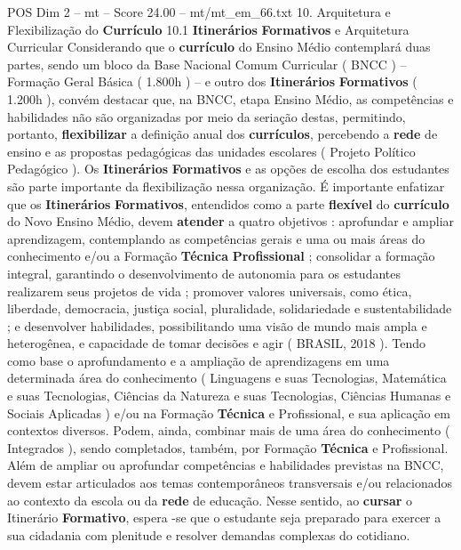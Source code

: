\begin{textsample}{POS Dim 2 – mt – Score 24.00 – mt/mt\_em\_66.txt}  \label{ex:f2_pos_227}
10.
Arquitetura e Flexibilização do \textbf{Currículo} 10.1 \textbf{Itinerários} \textbf{Formativos} e Arquitetura Curricular Considerando que o \textbf{currículo} do Ensino Médio contemplará duas partes, sendo um bloco da Base Nacional Comum Curricular ( BNCC ) – Formação Geral Básica ( 1.800h ) – e outro dos \textbf{Itinerários} \textbf{Formativos} ( 1.200h ), convém destacar que, na BNCC, etapa Ensino Médio, as competências e habilidades não são organizadas por meio da seriação destas, permitindo, portanto, \textbf{flexibilizar} a definição anual dos \textbf{currículos}, percebendo a \textbf{rede} de ensino e as propostas pedagógicas das unidades escolares ( Projeto Político Pedagógico ).
Os \textbf{Itinerários} \textbf{Formativos} e as opções de escolha dos estudantes são parte importante da flexibilização nessa organização.
É importante enfatizar que os \textbf{Itinerários} \textbf{Formativos}, entendidos como a parte \textbf{flexível} do \textbf{currículo} do Novo Ensino Médio, devem \textbf{atender} a quatro objetivos : aprofundar e ampliar aprendizagem, contemplando as competências gerais e uma ou mais áreas do conhecimento e/ou a Formação \textbf{Técnica} \textbf{Profissional} ; consolidar a formação integral, garantindo o desenvolvimento de autonomia para os estudantes realizarem seus projetos de vida ; promover valores universais, como ética, liberdade, democracia, justiça social, pluralidade, solidariedade e sustentabilidade ; e desenvolver habilidades, possibilitando uma visão de mundo mais ampla e heterogênea, e capacidade de tomar decisões e agir ( BRASIL, 2018 ).
Tendo como base o aprofundamento e a ampliação de aprendizagens em uma determinada área do conhecimento ( Linguagens e suas Tecnologias, Matemática e suas Tecnologias, Ciências da Natureza e suas Tecnologias, Ciências Humanas e Sociais Aplicadas ) e/ou na Formação \textbf{Técnica} e Profissional, e sua aplicação em contextos diversos.
Podem, ainda, combinar mais de uma área do conhecimento ( Integrados ), sendo completados, também, por Formação \textbf{Técnica} e Profissional.
Além de ampliar ou aprofundar competências e habilidades previstas na BNCC, devem estar articulados aos temas contemporâneos transversais e/ou relacionados ao contexto da escola ou da \textbf{rede} de educação.
Nesse sentido, ao \textbf{cursar} o Itinerário \textbf{Formativo}, espera -se que o estudante seja preparado para exercer a sua cidadania com plenitude e resolver demandas complexas do cotidiano.

\end{textsample}
